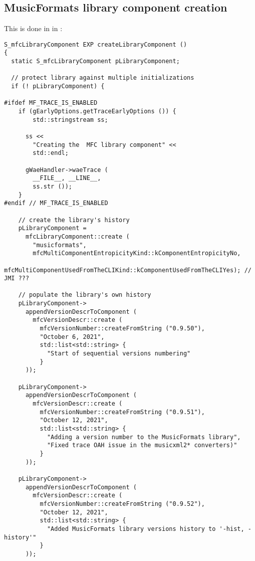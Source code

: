 \subsection{MusicFormats library component creation}\label{MusicFormats library component creation}

This is done in  in :
\begin{lstlisting}[language=CPlusPlus]
S_mfcLibraryComponent EXP createLibraryComponent ()
{
  static S_mfcLibraryComponent pLibraryComponent;

  // protect library against multiple initializations
  if (! pLibraryComponent) {

#ifdef MF_TRACE_IS_ENABLED
    if (gEarlyOptions.getTraceEarlyOptions ()) {
	  	std::stringstream ss;

      ss <<
        "Creating the  MFC library component" <<
        std::endl;

      gWaeHandler->waeTrace (
        __FILE__, __LINE__,
        ss.str ());
    }
#endif // MF_TRACE_IS_ENABLED

    // create the library's history
    pLibraryComponent =
      mfcLibraryComponent::create (
        "musicformats",
        mfcMultiComponentEntropicityKind::kComponentEntropicityNo,
        mfcMultiComponentUsedFromTheCLIKind::kComponentUsedFromTheCLIYes); // JMI ???

    // populate the library's own history
    pLibraryComponent->
      appendVersionDescrToComponent (
        mfcVersionDescr::create (
          mfcVersionNumber::createFromString ("0.9.50"),
          "October 6, 2021",
          std::list<std::string> {
            "Start of sequential versions numbering"
          }
      ));

    pLibraryComponent->
      appendVersionDescrToComponent (
        mfcVersionDescr::create (
          mfcVersionNumber::createFromString ("0.9.51"),
          "October 12, 2021",
          std::list<std::string> {
            "Adding a version number to the MusicFormats library",
            "Fixed trace OAH issue in the musicxml2* converters)"
          }
      ));

    pLibraryComponent->
      appendVersionDescrToComponent (
        mfcVersionDescr::create (
          mfcVersionNumber::createFromString ("0.9.52"),
          "October 12, 2021",
          std::list<std::string> {
            "Added MusicFormats library versions history to '-hist, -history'"
          }
      ));


\end{lstlisting}
